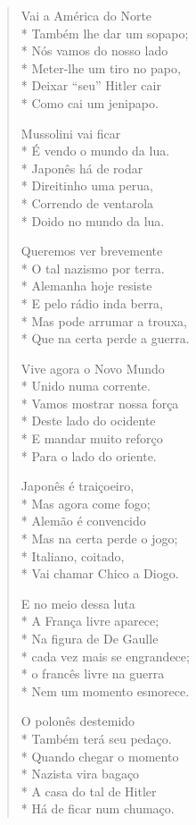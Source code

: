\begin{verse}
Vai a América do Norte\\*
Também lhe dar um sopapo;\\*
Nós vamos do nosso lado\\*
Meter-lhe um tiro no papo,\\*
Deixar “seu” Hitler cair\\*
Como cai um jenipapo.

Mussolini vai ficar\\*
É vendo o mundo da lua.\\*
Japonês há de rodar\\*
Direitinho uma perua,\\*
Correndo de ventarola\\*
Doido no mundo da lua.

Queremos ver brevemente\\*
O tal nazismo por terra.\\*
Alemanha hoje resiste\\*
E pelo rádio inda berra,\\*
Mas pode arrumar a trouxa,\\*
Que na certa perde a guerra.

Vive agora o Novo Mundo\\*
Unido numa corrente.\\*
Vamos mostrar nossa força\\*
Deste lado do ocidente\\*
E mandar muito reforço\\*
Para o lado do oriente.

Japonês é traiçoeiro,\\*
Mas agora come fogo;\\*
Alemão é convencido\\*
Mas na certa perde o jogo;\\*
Italiano, coitado,\\*
Vai chamar Chico a Diogo.

E no meio dessa luta\\*
A França livre aparece;\\*
Na figura de De Gaulle\\*
cada vez mais se engrandece;\\*
o francês livre na guerra\\*
Nem um momento esmorece.

O polonês destemido\\*
Também terá seu pedaço.\\*
Quando chegar o momento\\*
Nazista vira bagaço\\*
A casa do tal de Hitler\\*
Há de ficar num chumaço.


\end{verse}
